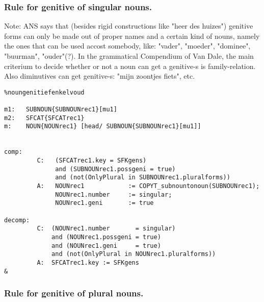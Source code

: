 \subsubsection{Rule for genitive of singular nouns.}

Note: ANS says that (besides rigid constructions like "heer des huizes") 
      genitive forms can only be made out of proper names and a certain kind of
      nouns, namely the ones that can be used accost somebody, like: "vader",
      "moeder", "dominee", "buurman", "ouder"(?). In the grammatical Compendium
      of Van Dale, the main criterium to decide whether or not a noun can get 
      a genitive-s is family-relation.
      Also diminutives can get genitive-s: "mijn zoontjes fiets", etc.
\begin{verbatim}      
%noungenitiefenkelvoud

m1:   SUBNOUN{SUBNOUNrec1}[mu1]
m2:   SFCAT{SFCATrec1}
m:    NOUN{NOUNrec1} [head/ SUBNOUN{SUBNOUNrec1}[mu1]]


comp:    
         C:   (SFCATrec1.key = SFKgens) 
              and (SUBNOUNrec1.possgeni = true)
              and (not(OnlyPlural in SUBNOUNrec1.pluralforms))
         A:   NOUNrec1            := COPYT_subnountonoun(SUBNOUNrec1);
              NOUNrec1.number     := singular;
              NOUNrec1.geni       := true

decomp:  
         C:  (NOUNrec1.number       = singular)
             and (NOUNrec1.possgeni = true)
             and (NOUNrec1.geni     = true) 
             and (not(OnlyPlural in NOUNrec1.pluralforms))
         A:  SFCATrec1.key := SFKgens
&
\end{verbatim}
\newpage
\subsubsection{Rule for genitive of plural nouns.}

